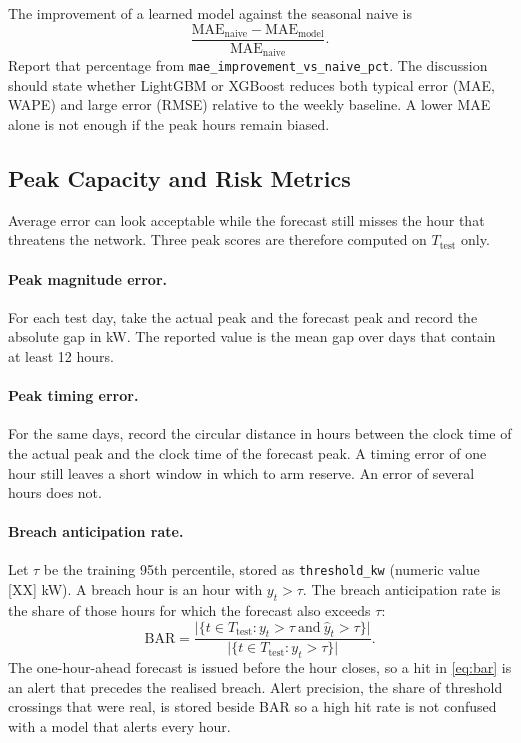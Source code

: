 The improvement of a learned model against the seasonal naive is
\[
  \frac{\mathrm{MAE}_{\mathrm{naive}}-\mathrm{MAE}_{\mathrm{model}}}{\mathrm{MAE}_{\mathrm{naive}}}.
\]
Report that percentage from \texttt{mae\_improvement\_vs\_naive\_pct}. The
discussion should state whether LightGBM or XGBoost reduces both typical
error (MAE, WAPE) and large error (RMSE) relative to the weekly baseline.
A lower MAE alone is not enough if the peak hours remain biased.

\subsection{Peak Capacity and Risk Metrics}
\label{sec:peak}

Average error can look acceptable while the forecast still misses the hour
that threatens the network. Three peak scores are therefore computed on
\(T_{\mathrm{test}}\) only.

\paragraph{Peak magnitude error.}
For each test day, take the actual peak and the forecast peak and record the
absolute gap in kW. The reported value is the mean gap over days that contain
at least 12 hours.

\paragraph{Peak timing error.}
For the same days, record the circular distance in hours between the clock
time of the actual peak and the clock time of the forecast peak. A timing
error of one hour still leaves a short window in which to arm reserve. An
error of several hours does not.

\paragraph{Breach anticipation rate.}
Let \(\tau\) be the training 95th percentile, stored as \texttt{threshold\_kw}
(numeric value [XX] kW). A breach hour is an hour with \(y_t>\tau\). The
breach anticipation rate is the share of those hours for which the forecast
also exceeds \(\tau\):
\begin{equation}
  \mathrm{BAR}
  = \frac{\lvert\{t\in T_{\mathrm{test}}: y_t>\tau \ \mathrm{and}\ \hat{y}_t>\tau\}\rvert}
         {\lvert\{t\in T_{\mathrm{test}}: y_t>\tau\}\rvert}.
  \label{eq:bar}
\end{equation}
The one-hour-ahead forecast is issued before the hour closes, so a hit in
\eqref{eq:bar} is an alert that precedes the realised breach. Alert precision,
the share of threshold crossings that were real, is stored beside BAR so a
high hit rate is not confused with a model that alerts every hour.

